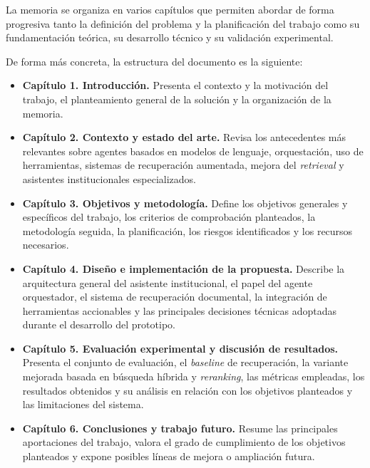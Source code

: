 La memoria se organiza en varios capítulos que permiten abordar de forma progresiva tanto la definición del problema y la planificación del trabajo como su fundamentación teórica, su desarrollo técnico y su validación experimental.

De forma más concreta, la estructura del documento es la siguiente:

\begin{itemize}
    \item \textbf{Capítulo 1. Introducción.} Presenta el contexto y la motivación del trabajo, el planteamiento general de la solución y la organización de la memoria.
    
    \item \textbf{Capítulo 2. Contexto y estado del arte.} Revisa los antecedentes más relevantes sobre agentes basados en modelos de lenguaje, orquestación, uso de herramientas, sistemas de recuperación aumentada, mejora del \textit{retrieval} y asistentes institucionales especializados.
    
    \item \textbf{Capítulo 3. Objetivos y metodología.} Define los objetivos generales y específicos del trabajo, los criterios de comprobación planteados, la metodología seguida, la planificación, los riesgos identificados y los recursos necesarios.
    
    \item \textbf{Capítulo 4. Diseño e implementación de la propuesta.} Describe la arquitectura general del asistente institucional, el papel del agente orquestador, el sistema de recuperación documental, la integración de herramientas accionables y las principales decisiones técnicas adoptadas durante el desarrollo del prototipo.
    
    \item \textbf{Capítulo 5. Evaluación experimental y discusión de resultados.} Presenta el conjunto de evaluación, el \textit{baseline} de recuperación, la variante mejorada basada en búsqueda híbrida y \textit{reranking}, las métricas empleadas, los resultados obtenidos y su análisis en relación con los objetivos planteados y las limitaciones del sistema.
    
    \item \textbf{Capítulo 6. Conclusiones y trabajo futuro.} Resume las principales aportaciones del trabajo, valora el grado de cumplimiento de los objetivos planteados y expone posibles líneas de mejora o ampliación futura.
\end{itemize}
    
